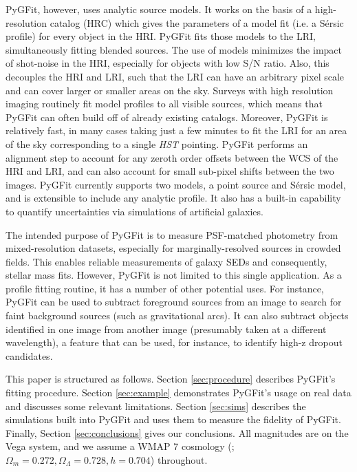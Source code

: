 \documentclass[apj]{emulateapj}
\newcommand{\sersic}{S\'{e}rsic}
\newcommand{\pygfit}{PyGFit}
\begin{document}
\pygfit{}, however, uses analytic source models.  It works on the basis of a high-resolution catalog (HRC) which gives the parameters of a model fit (i.e. a \sersic{} profile) for every object in the HRI.  \pygfit{} fits those models to the LRI, simultaneously fitting blended sources.  The use of models minimizes the impact of shot-noise in the HRI, especially for objects with low S/N ratio.  Also, this decouples the HRI and LRI, such that the LRI can have an arbitrary pixel scale and can cover larger or smaller areas on the sky.  Surveys with high resolution imaging routinely fit model profiles to all visible sources, which means that \pygfit{} can often build off of already existing catalogs.  Moreover, \pygfit{} is relatively fast, in many cases taking just a few minutes to fit the LRI for an area of the sky corresponding to a single {\itshape HST} pointing.  \pygfit{} performs an alignment step to account for any zeroth order offsets between the WCS of the HRI and LRI, and can also account for small sub-pixel shifts between the two images.  \pygfit{} currently supports two models, a point source and \sersic{} model, and is extensible to include any analytic profile.  It also has a built-in capability to quantify uncertainties via simulations of artificial galaxies.

The intended purpose of \pygfit{} is to measure PSF-matched photometry from mixed-resolution datasets, especially for marginally-resolved sources in crowded fields.  This enables reliable measurements of galaxy SEDs and consequently, stellar mass fits.  However, \pygfit{} is not limited to this single application.  As a profile fitting routine, it has a number of other potential uses.  For instance, \pygfit{} can be used to subtract foreground sources from an image to search for faint background sources (such as gravitational arcs).  It can also subtract objects identified in one image from another image (presumably taken at a different wavelength), a feature that can be used, for instance, to identify high-z dropout candidates.

This paper is structured as follows.  Section \ref{sec:procedure} describes \pygfit{}'s fitting procedure.  Section \ref{sec:example} demonstrates \pygfit{}'s usage on real data and discusses some relevant limitations.  Section \ref{sec:sims} describes the simulations built into \pygfit{} and uses them to measure the fidelity of \pygfit{}.  Finally, Section \ref{sec:conclusions} gives our conclusions.  All magnitudes are on the Vega system, and we assume a WMAP 7 cosmology (\citealt{komatsu11}; $\Omega_m=0.272, \Omega_\Lambda=0.728, h=0.704$) throughout.
\end{document}
